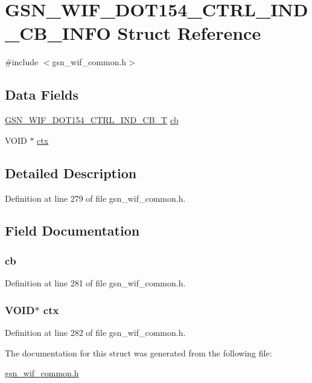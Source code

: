 \hypertarget{a00335}{
\section{GSN\_\-WIF\_\-DOT154\_\-CTRL\_\-IND\_\-CB\_\-INFO Struct Reference}
\label{a00335}
}


{\ttfamily \#include $<$gsn\_\-wif\_\-common.h$>$}

\subsection*{Data Fields}
\begin{DoxyCompactItemize}
\item 
\hyperlink{a00635_gaf83e1299bf211f7c06ff40e18f1d3ad4}{GSN\_\-WIF\_\-DOT154\_\-CTRL\_\-IND\_\-CB\_\-T} \hyperlink{a00335_a7a31ac982730d52be74c61e48b074295}{cb}
\item 
VOID $\ast$ \hyperlink{a00335_add401254b29adaa41706c97d1c8d3e89}{ctx}
\end{DoxyCompactItemize}


\subsection{Detailed Description}


Definition at line 279 of file gsn\_\-wif\_\-common.h.



\subsection{Field Documentation}
\hypertarget{a00335_a7a31ac982730d52be74c61e48b074295}{
\subsubsection[{cb}]{ {\bf cb}}}
\label{a00335_a7a31ac982730d52be74c61e48b074295}


Definition at line 281 of file gsn\_\-wif\_\-common.h.

\hypertarget{a00335_add401254b29adaa41706c97d1c8d3e89}{
\subsubsection[{ctx}]{\setlength{\rightskip}{0pt plus 5cm}VOID$\ast$ {\bf ctx}}}
\label{a00335_add401254b29adaa41706c97d1c8d3e89}


Definition at line 282 of file gsn\_\-wif\_\-common.h.



The documentation for this struct was generated from the following file:\begin{DoxyCompactItemize}
\item 
\hyperlink{a00608}{gsn\_\-wif\_\-common.h}\end{DoxyCompactItemize}
